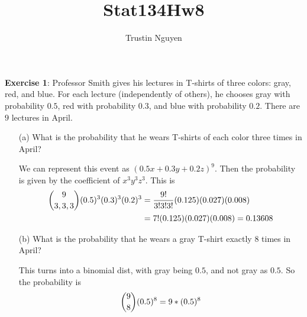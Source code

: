 \documentclass{article}
\title{Stat134Hw8}
\author{Trustin Nguyen}
\begin{document}
    \maketitle

\reversemarginpar

\textbf{Exercise 1}: Professor Smith gives his lectures in T-shirts of three colors: gray, red, and blue. For each lecture (independently of others), he chooses gray with probability $0.5$, red with probability $0.3$, and blue with probability $0.2$. There are $9$ lectures in April.
    \begin{itemize}
        \item [(a)] What is the probability that he wears T-shirts of each color three times in April?
            \begin{answer}
                We can represent this event as $(0.5x + 0.3y + 0.2z)^{9}$. Then the probability is given by the coefficient of $x^{3}y^{3}z^{3}$. This is 
                    \begin{align*}
                        \dbinom{9}{3, 3, 3}(0.5)^{3}(0.3)^{3}(0.2)^{3} &= \dfrac{9!}{3!3!3!}(0.125)(0.027)(0.008) \\
                        &= 7!(0.125)(0.027)(0.008) = 0.13608
                    \end{align*}
            \end{answer}

        \item [(b)] What is the probability that he wears a gray T-shirt exactly $8$ times in April?
            \begin{answer}
                This turns into a binomial dist, with gray being $0.5$, and not gray as $0.5$. So the probability is
                    \begin{equation*}
                        \dbinom{9}{8}(0.5)^{8} = 9 * (0.5)^{8}
                    \end{equation*}
            \end{answer}
    \end{itemize}

\newpage
\end{document}

